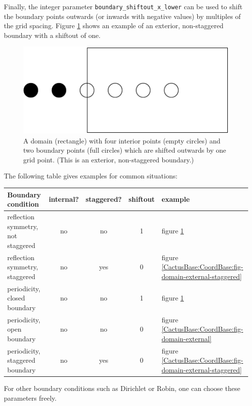 Finally, the integer parameter {\texttt{boundary\_shiftout\_x\_lower}}
can be used to shift the boundary points outwards (or inwards with
negative values) by multiples of the grid spacing.  Figure
{\ref{CactusBase:CoordBase:fig-domain-external-shiftout}} shows an
example of an exterior, non-staggered boundary with a shiftout of one.

\begin{figure}
\begin{center}
\includegraphics[scale=0.75]{domain-external-shiftout}
\end{center}
\caption{A domain (rectangle) with four interior points (empty circles)
and two boundary points (full circles) which are shifted outwards by
one grid point.  (This is an exterior, non-staggered boundary.)}
\label{CactusBase:CoordBase:fig-domain-external-shiftout}
\end{figure}

The following table gives examples for common situations:

\begin{tabular}{l|ccc|l}
Boundary condition & internal? & staggered? & shiftout & example \\\hline
reflection symmetry, not staggered & no & no & 1
   & figure {\ref{CactusBase:CoordBase:fig-domain-external-shiftout}} \\
reflection symmetry, staggered & no & yes & 0
   & figure {\ref{CactusBase:CoordBase:fig-domain-external-staggered}} \\
periodicity, closed boundary & no & no & 1
   & figure {\ref{CactusBase:CoordBase:fig-domain-external-shiftout}} \\
periodicity, open boundary & no & no & 0
   & figure {\ref{CactusBase:CoordBase:fig-domain-external}} \\
periodicity, staggered boundary & no & yes & 0
   & figure {\ref{CactusBase:CoordBase:fig-domain-external-staggered}}
\end{tabular}

For other boundary conditions such as Dirichlet or Robin, one can
choose these parameters freely.

